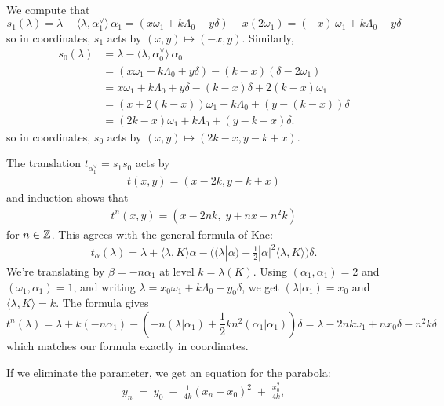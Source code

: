 \documentclass[12pt]{article}
\begin{document}
We compute that
\[s_1(\lambda) = \lambda - \langle \lambda, \alpha_1^\vee\rangle\, \alpha_1
    = (x\omega_1 + k\Lambda_0 + y\delta) - x(2\omega_1)
    = (-x)\,\omega_1 + k\Lambda_0 + y\delta\] so in coordinates, $s_1$ acts by $(x,y) \mapsto (-x,y)$. Similarly,
\[\begin{aligned}
        s_0(\lambda) & = \lambda - \langle \lambda, \alpha_0^\vee\rangle\, \alpha_0      \\
                     & = (x\omega_1 + k\Lambda_0 + y\delta) - (k-x)(\delta - 2\omega_1)  \\
                     & = x\omega_1 + k\Lambda_0 + y\delta - (k-x)\delta + 2(k-x)\omega_1 \\
                     & = (x + 2(k - x))\omega_1 + k\Lambda_0 + (y - (k - x))\delta       \\
                     & = (2k - x)\omega_1 + k\Lambda_0 + (y - k + x)\delta.
    \end{aligned}\]
so in coordinates, $s_0$ acts by $(x,y) \mapsto (2k - x, y - k + x)$.

The translation $t_{\alpha_1^\vee} = s_1s_0$ acts by \begin{align*}
    t(x,y)=(x-2k,y-k+x)
\end{align*} and induction shows that \begin{align*}
    t^n(x,y) = (x - 2nk, \; y + n x - n^2 k)
\end{align*} for $n \in \mathbb{Z}$. This agrees with the general formula of Kac:
\begin{align*}
    t_\alpha(\lambda)
    = \lambda + \langle \lambda, K \rangle \alpha
    - \big( (\lambda|\alpha)
    + \tfrac{1}{2}|\alpha|^2 \langle \lambda, K \rangle \big)\delta.
\end{align*}
We're translating by $\beta=-n\alpha_1$ at level $k=\lambda(K)$. Using $(\alpha_1,\alpha_1)=2$ and $(\omega_1,\alpha_1)=1$, and writing $\lambda = x_0\omega_1 + k\Lambda_0 + y_0\delta$, we get $(\lambda|\alpha_1)=x_0$ and $\langle \lambda,K\rangle = k$. The formula gives \[t^n(\lambda) = \lambda + k(-n\alpha_1) - ( -n(\lambda|\alpha_1) + \frac{1}{2} kn^2(\alpha_1|\alpha_1))\delta = \lambda - 2nk\omega_1 + nx_0\delta - n^2k\delta\] which matches our formula exactly in coordinates.

If we eliminate the parameter, we get an equation for the parabola:
\begin{align*}
    y_n \;=\; y_0 \;-\;\frac{1}{4k}(x_n - x_0)^2 \;+\; \frac{x_0^2}{4k},
\end{align*}
\end{document}
